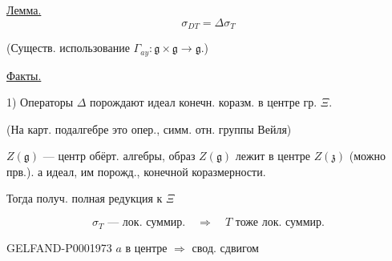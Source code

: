 \underline{Лемма.}
\begin{equation*}\sigma_{DT}=\Delta\sigma_T\end{equation*}



(Существ. использование $\Gamma_{ay}:\mathfrak g\times\mathfrak g\longrightarrow\mathfrak g$.)



\underline{Факты.}



1) Операторы $\Delta$ порождают идеал конечн. коразм. в центре гр. $\Xi$.



(На карт. подалгебре это опер., симм. отн. группы Вейля)








$Z(\mathfrak g)$ — центр обёрт. алгебры, образ $Z(\mathfrak g)$ лежит
в центре $Z(\mathfrak z)$ (можно прв.). а идеал, им
порожд., конечной коразмерности.








Тогда получ. полная редукция к $\Xi$



\begin{equation*}
\sigma_T\text{ — лок. суммир.}\quad\Longrightarrow\quad T\text{ тоже лок. суммир.}
\end{equation*}



\begin{GelfandAdjacentEvidence}{GELFAND-P000197}{3}
$a$ в центре $\Longrightarrow$ свод. сдвигом



\end{GelfandAdjacentEvidence}

